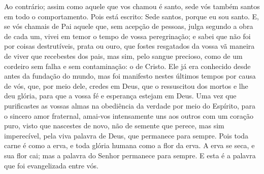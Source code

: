{{}
  Ao contrário; assim como aquele que vos chamou é santo, sede vós também santos em todo o
{} comportamento.
  Pois está escrito: Sede santos, porque eu sou santo.
{}
  E, se vós chamais de Pai aquele que, sem acepção de pessoas, julga segundo a obra de cada um, vivei em temor o tempo de vossa peregrinação;
  e sabei que não foi por coisas destrutíveis,
{} prata ou ouro, que fostes resgatados da vossa vã maneira de viver que recebestes dos
{} pais,
  mas sim, pelo sangue precioso, como de um cordeiro sem falha e sem contaminação: o
{} de Cristo.
  Ele já era conhecido
 desde antes da fundação do mundo, mas foi manifesto nestes últimos tempos por causa de vós,
  que, por meio dele, credes em Deus, que o ressuscitou dos mortos e lhe deu glória, para que a vossa fé e esperança estejam em Deus.
  Uma vez que purificastes as vossas almas na obediência da verdade por meio do Espírito, para o sincero
 amor fraternal, amai-vos intensamente uns aos outros com um coração puro,
  visto que nascestes de novo, não de semente que perece, mas sim imperecível, pela viva palavra de Deus, que permanece para sempre.
  Pois toda carne
 é como a erva, e toda glória humana como a flor da erva. A erva se seca, e sua flor cai;
  mas a palavra do Senhor permanece para sempre. E esta é a palavra que foi evangelizada entre vós.
{}
\par }

